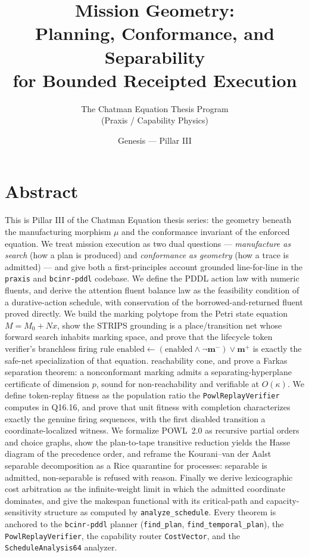 \documentclass[11pt,oneside]{book}
\title{\bfseries Mission Geometry:\\[0.4em]
\large Planning, Conformance, and Separability\\
for Bounded Receipted Execution}
\author{The Chatman Equation Thesis Program \\ (Praxis / Capability Physics)}
\date{Genesis --- Pillar III}
\theoremstyle{definition}
\theoremstyle{plain}
\theoremstyle{remark}
\newcommand{\muop}{\mu}                        %
\newcommand{\CL}{\kappa}                       %
\newcommand{\Nmat}{N}                 %
\newcommand{\preset}{\mathbf{m}^{-}}
\newcommand{\postset}{\mathbf{m}^{+}}
\newcommand{\code}[1]{\texttt{#1}}
\begin{document}
\frontmatter
\maketitle

\chapter*{Abstract}
This is Pillar III of the Chatman Equation thesis series: the geometry beneath the
manufacturing morphism $\muop$ and the conformance invariant of the enforced equation. We
treat mission execution as two dual questions --- \emph{manufacture as search} (how a plan
is produced) and \emph{conformance as geometry} (how a trace is admitted) --- and give both
a first-principles account grounded line-for-line in the \code{praxis} and \code{bcinr-pddl}
codebase. We define the PDDL action law with numeric fluents, and derive the attention
fluent balance law as the feasibility condition of a durative-action schedule, with
conservation of the borrowed-and-returned fluent proved directly. We build the marking
polytope from the Petri state equation $M=M_0+\Nmat x$, show the STRIPS
grounding is a place/transition net whose forward search inhabits marking space, and prove
that the lifecycle token verifier's branchless firing rule
$\text{enabled}\gets(\text{enabled}\wedge\lnot\preset)\vee\postset$ is exactly the
safe-net specialization of that equation.%
reachability cone, and prove a Farkas separation theorem: a nonconformant marking admits a
separating-hyperplane certificate of dimension $p$, sound for non-reachability and verifiable
at $O(\CL)$. We define token-replay fitness as the population ratio the
\code{PowlReplayVerifier} computes in Q16.16, and prove that unit fitness with completion
characterizes exactly the genuine firing sequences, with the first disabled transition a
coordinate-localized witness. We formalize POWL~2.0 as recursive partial orders and choice
graphs, show the plan-to-tape transitive reduction yields the Hasse diagram of the precedence
order, and reframe the Kourani--van der Aalst separable decomposition
\cite{powl2023} as a Rice quarantine for processes: separable is admitted, non-separable is
refused with reason. Finally we derive lexicographic cost arbitration as the infinite-weight
limit in which the admitted coordinate dominates, and give the makespan functional with its
critical-path and capacity-sensitivity structure as computed by \code{analyze\_schedule}.
Every theorem is anchored to the \code{bcinr-pddl} planner (\code{find\_plan},
\code{find\_temporal\_plan}), the \code{PowlReplayVerifier}, the capability router
\code{CostVector}, and the \code{ScheduleAnalysis64} analyzer.
\end{document}
